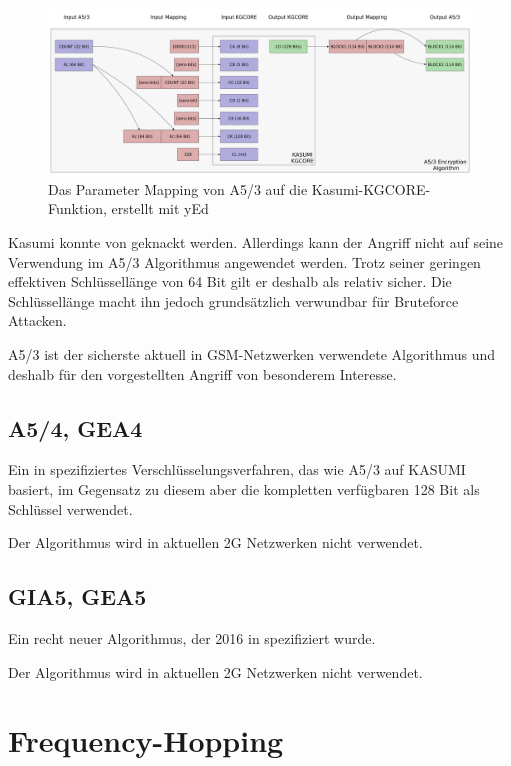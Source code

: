 \begin{figure}[H]
  \begin{center}
    \includegraphics[width=1.0\textwidth]{figures/a53_encryption.pdf}
  \end{center}
  \caption[Das Parameter Mapping von A5/3 auf die Kasumi-KGCORE-Funktion]{Das Parameter Mapping von A5/3 auf die Kasumi-KGCORE-Funktion, erstellt mit yEd} \label{fig:fig-a53-encryption}
\end{figure}

Kasumi konnte von \citet{dunkelman2010practical} geknackt werden. Allerdings kann der Angriff nicht auf seine Verwendung im A5/3 Algorithmus angewendet werden. Trotz seiner geringen effektiven Schlüssellänge von 64 Bit gilt er deshalb als relativ sicher. Die Schlüssellänge macht ihn jedoch grundsätzlich verwundbar für Bruteforce Attacken. \citep{nohl2014mobile}

A5/3 ist der sicherste aktuell in \ac{GSM}-Netzwerken verwendete Algorithmus und deshalb für den vorgestellten Angriff von besonderem Interesse.

\subsection{A5/4, GEA4}
Ein in  spezifiziertes Verschlüsselungsverfahren, das wie A5/3 auf KASUMI basiert, im Gegensatz zu diesem aber die kompletten verfügbaren 128 Bit als Schlüssel verwendet.

Der Algorithmus wird in aktuellen 2G Netzwerken nicht verwendet.

\subsection{GIA5, GEA5}
Ein recht neuer Algorithmus, der 2016 in  spezifiziert wurde.

Der Algorithmus wird in aktuellen 2G Netzwerken nicht verwendet.

\section{Frequency-Hopping}

